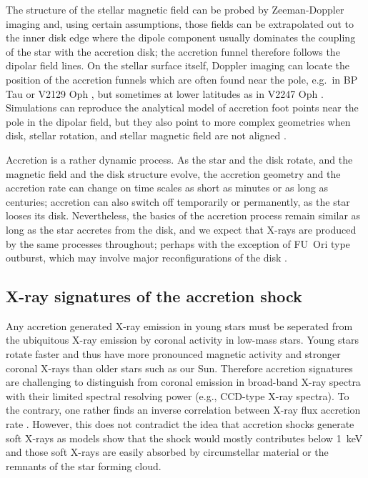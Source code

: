 \documentclass[graybox, nosecnum]{svmult}
\begin{document}
The structure of the stellar magnetic field can be probed by Zeeman-Doppler imaging and, using certain assumptions, those fields can be extrapolated out to the inner disk edge where the dipole component usually dominates the coupling of the star with the accretion disk; the accretion funnel therefore follows the dipolar field lines. On the stellar surface itself, Doppler imaging can locate the position of the accretion funnels which are often found near the pole, e.g.\ in BP Tau \cite{2008MNRAS.386.1234D} or V2129 Oph \cite{2011A&A...530A...1A}, but sometimes at lower latitudes as in V2247 Oph \cite{2010MNRAS.402.1426D}. 
Simulations can reproduce the analytical model of accretion foot points near the pole in the dipolar field, but they also point to more complex geometries when disk, stellar rotation, and stellar magnetic field are not aligned \cite{2021MNRAS.506..372R}.

Accretion is a rather dynamic process. As the star and the disk rotate, and the magnetic field and the disk structure evolve, the accretion geometry and the accretion rate can change on time scales as short as minutes or as long as centuries; accretion can also switch off temporarily or permanently, as the star looses its disk. Nevertheless, the basics of the  accretion process remain similar as long as the star accretes from the disk, and we expect that X-rays are produced by the same processes throughout; perhaps with the exception of FU~Ori type outburst, which may involve major reconfigurations of the disk \cite{2014prpl.conf..387A}. 


\subsection{X-ray signatures of the accretion shock}
\label{sect:accretionobs}
Any accretion generated X-ray emission in young stars must be seperated from the ubiquitous X-ray emission by coronal activity in low-mass stars. Young stars rotate faster and thus have more pronounced magnetic activity and stronger coronal X-rays than older stars such as our Sun. Therefore accretion signatures are challenging to distinguish from coronal emission in broad-band X-ray spectra with their limited spectral resolving power (e.g., CCD-type X-ray spectra). To the contrary, one rather finds an inverse correlation between X-ray flux  accretion rate \cite{2005ApJS..160..401P, Schneider_2018}. However, this does not contradict the idea that accretion shocks generate soft X-rays as models show that the shock would mostly contributes below 1~keV \cite{1999AstL...25..430L} and those soft X-rays are easily absorbed by circumstellar material or the remnants of the star forming cloud.
\end{document}
